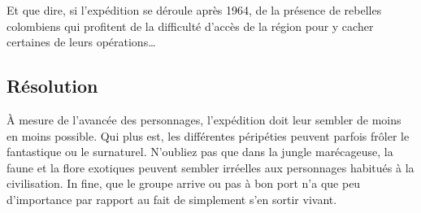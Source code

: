 Et que dire, si l'expédition se déroule après 1964, de la présence de rebelles colombiens qui profitent de la difficulté d'accès de la région pour y cacher certaines de leurs opérations\dots

\subsection{Résolution}

À mesure de l'avancée des personnages, l'expédition doit leur sembler de moins en moins possible.
Qui plus est, les différentes péripéties peuvent parfois frôler le fantastique ou le surnaturel.
N'oubliez pas que dans la jungle marécageuse, la faune et la flore exotiques peuvent sembler irréelles aux personnages habitués à la civilisation.
In fine, que le groupe arrive ou pas à bon port n'a que peu d'importance par rapport au fait de simplement s'en sortir vivant.

